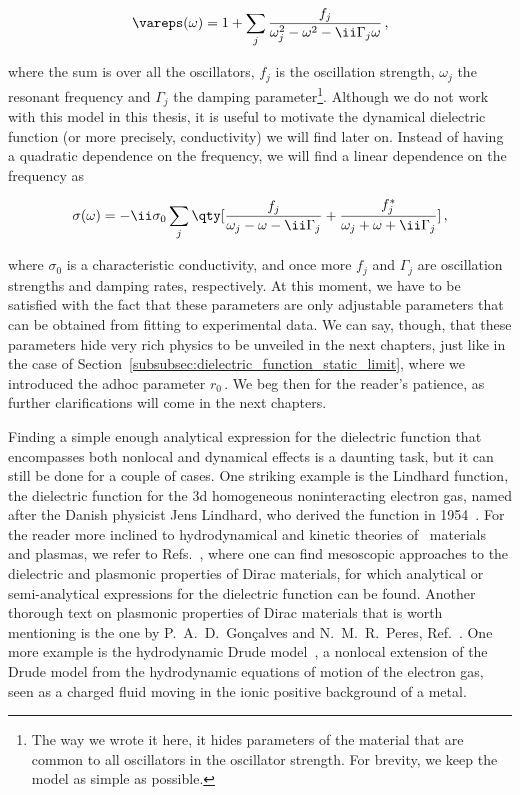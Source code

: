 \begin{equation}
    \vareps (\omega) = 1 + \sum_{j} \frac{f_j}{\omega_j^2 - \omega^2 - \ii \Gamma_j \omega}\,,
\end{equation}

\noindent where the sum is over all the oscillators, $f_j$ is the oscillation strength, $\omega_j$ the resonant frequency and $\Gamma_j$ the damping parameter\footnote{The way we wrote it here, it hides parameters of the material that are common to all oscillators in the oscillator strength. For brevity, we keep the model as simple as possible.}.
Although we do not work with this model in this thesis, it is useful to motivate the dynamical dielectric function (or more precisely, conductivity) we will find later on.
Instead of having a quadratic dependence on the frequency, we will find a linear dependence on the frequency as

\begin{equation}
    \label{eq:optical_conductivity_model}
    \sigma(\omega) = -\ii \sigma_0 \sum_j \qty[ \frac{f_j}{\omega_j -  \omega - \ii \Gamma_j} + \frac{f^*_j}{\omega_j + \omega + \ii \Gamma_j}]\,,
\end{equation}

\noindent where $\sigma_0$ is a characteristic conductivity, and once more $f_j$ and $\Gamma_j$ are oscillation strengths and damping rates, respectively.
At this moment, we have to be satisfied with the fact that these parameters are only adjustable parameters that can be obtained from fitting to experimental data.
We can say, though, that these parameters hide very rich physics to be unveiled in the next chapters, just like in the case of Section~\ref{subsubsec:dielectric_function_static_limit}, where we introduced the adhoc parameter $r_0$\,.
We beg then for the reader's patience, as further clarifications will come in the next chapters.

Finding a simple enough analytical expression for the dielectric function that encompasses both nonlocal and dynamical effects is a daunting task, but it can still be done for a couple of cases.
One striking example is the Lindhard function, the dielectric function for the \gls{3d} homogeneous noninteracting electron gas, named after the Danish physicist Jens Lindhard, who derived the function in 1954~\cite{Lindhard_1954}.
For the reader more inclined to hydrodynamical and kinetic theories of \bd~materials and plasmas, we refer to Refs.~\cite{Chen_Plasma_Physics,Cosme_2025}, where one can find mesoscopic approaches to the dielectric and plasmonic properties of Dirac materials, for which analytical or semi-analytical expressions for the dielectric function can be found.
Another thorough text on plasmonic properties of Dirac materials that is worth mentioning is the one by P.~A.~D.~Gon\c{c}alves and N.~M.~R.~Peres, Ref.~\cite{GoncalvesPeres:2016}.
One more example is the hydrodynamic Drude model~\cite{Bloch_1933,Andre_Goncalves_2020}, a nonlocal extension of the Drude model from the hydrodynamic equations of motion of the electron gas, seen as a charged fluid moving in the ionic positive background of a metal.

